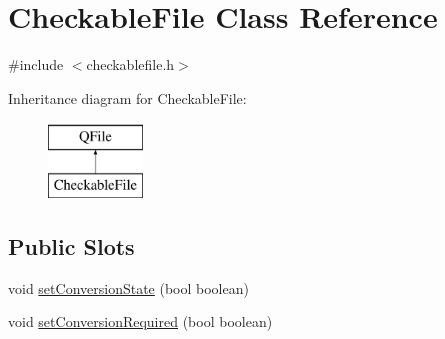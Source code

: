 \hypertarget{class_checkable_file}{}\section{Checkable\+File Class Reference}
\label{class_checkable_file}


{\ttfamily \#include $<$checkablefile.\+h$>$}

Inheritance diagram for Checkable\+File\+:\begin{figure}[H]
\begin{center}
\leavevmode
\includegraphics[height=2.000000cm]{class_checkable_file}
\end{center}
\end{figure}
\subsection*{Public Slots}
\begin{DoxyCompactItemize}
\item 
void \hyperlink{class_checkable_file_ac2436dd7ef1249c9cf5c33829b054284}{set\+Conversion\+State} (bool boolean)
\item 
void \hyperlink{class_checkable_file_a7edb6361bcdba016c76be3d9c3906d9e}{set\+Conversion\+Required} (bool boolean)
\end{DoxyCompactItemize}
